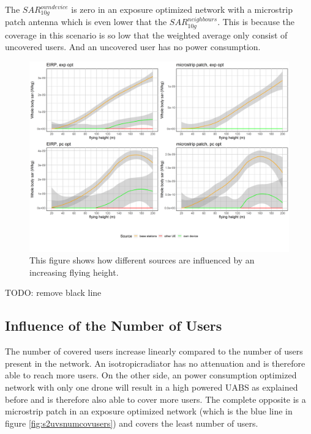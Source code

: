 The $SAR^{own device}_{10g}$ is zero in an exposure optimized network with a microstrip patch antenna which is even lower that the $SAR^{neighbours}_{10g}$.
This is because the coverage in this scenario is so low that the weighted average only consist of uncovered users. And an uncovered user has no power consumption.
\begin{figure}[h!]
  \includegraphics[width=\textwidth]{../results/s2/fhFourSources.png}
  \caption{This figure shows how different sources are influenced by an increasing flying height.}
  \label{fig:s2shfourSourcesMatrix}
\end{figure}

TODO: remove black line


\FloatBarrier
\subsection{Influence of the Number of Users}

The number of covered users increase linearly compared to the number of users present in the network.
An \gls{isotropicradiator} has no attenuation and is therefore able to reach more users. On the other side, an power consumption 
optimized network with only one drone will result in a high powered \gls{UABS} as explained before and is therefore also able to 
cover more users. The complete opposite is a microstrip patch in an exposure optimized network (which is the blue line in figure \ref{fig:s2uvsnumcovusers})
and covers the least number of users.

